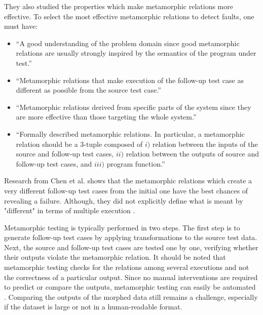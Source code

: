 They also studied the properties which make metamorphic relations more effective. To select the most effective metamorphic relations to detect faults, one must have\cite{Segura2016}:
\begin{itemize}
	\item \enquote{A good understanding of the problem domain since good metamorphic relations are usually strongly inspired by the semantics of the program under test.}
	\item \enquote{Metamorphic relations that make execution of the follow-up test case as different as possible from the source test case.}
	\item \enquote{Metamorphic relations derived from specific parts of the system since they are more effective than those targeting the whole system.}
	\item \enquote{Formally described metamorphic relations. In particular, a metamorphic relation should be a 3-tuple composed of $i)$ relation between the inputs of the source and follow-up test cases, $ii)$ relation between the outputs of source and follow-up test cases, and $iii)$ program function.}
\end{itemize}
Research from Chen et al. shows that the metamorphic relations which create a very different follow-up test cases from the initial one have the best chances of revealing a failure. Although, they did not explicitly define what is meant by "different" in terms of multiple execution \cite{Chen2003}.

Metamorphic testing is typically performed in two steps. The first step is to generate follow-up test cases by applying transformations to the source test data. Next, the source and follow-up test cases are tested one by one, verifying whether their outputs violate the metamorphic relation. It should be noted that metamorphic testing checks for the relations among several executions and not the correctness of a particular output. Since no manual interventions are required to predict or compare the outputs, metamorphic testing can easily be automated \cite{Segura2016}. Comparing the outputs of the morphed data still remains a challenge, especially if the dataset is large or not in a human-readable format.

